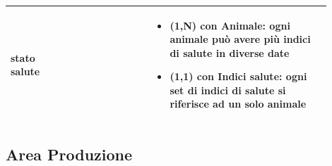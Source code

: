 \documentclass[12pt,a4paper]{article}
\begin{document}
\begin{center}
\begin{longtable}{|p{0.16\linewidth}|p{0.24\linewidth}|p{0.50\linewidth}|}
\hline
stato salute 				&   
					& \begin{itemize}
						\setlength{\itemindent}{-1em}
						\vspace{-25pt}
						\setlength\itemsep{-0.25em}
						\item (1,N) con Animale: ogni animale può avere più indici di salute in diverse date
						\item (1,1) con Indici salute: ogni set di indici di salute si riferisce ad un solo animale
					\end{itemize}\\ 

\hline

\end{longtable}
\end{center}
\pagebreak
\subsection{Area Produzione}
\end{document}
